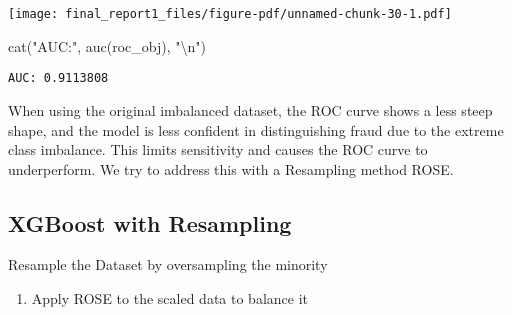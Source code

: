 \documentclass[
  11pt,
  letterpaper,
  DIV=11,
  numbers=noendperiod]{scrartcl}
\newenvironment{Shaded}{}{}
\newcommand{\AttributeTok}[1]{\textcolor[rgb]{0.84,0.23,0.29}{#1}}
\newcommand{\CommentTok}[1]{\textcolor[rgb]{0.42,0.45,0.49}{#1}}
\newcommand{\ConstantTok}[1]{\textcolor[rgb]{0.00,0.36,0.77}{#1}}
\newcommand{\DecValTok}[1]{\textcolor[rgb]{0.00,0.36,0.77}{#1}}
\newcommand{\FloatTok}[1]{\textcolor[rgb]{0.00,0.36,0.77}{#1}}
\newcommand{\FunctionTok}[1]{\textcolor[rgb]{0.44,0.26,0.76}{#1}}
\newcommand{\NormalTok}[1]{\textcolor[rgb]{0.14,0.16,0.18}{#1}}
\newcommand{\OtherTok}[1]{\textcolor[rgb]{0.44,0.26,0.76}{#1}}
\newcommand{\SpecialCharTok}[1]{\textcolor[rgb]{0.00,0.36,0.77}{#1}}
\newcommand{\StringTok}[1]{\textcolor[rgb]{0.01,0.18,0.38}{#1}}
\providecommand{\tightlist}{%
  \setlength{\itemsep}{0pt}\setlength{\parskip}{0pt}}\usepackage{longtable,booktabs,array}
\begin{document}
\texttt{[image: final\_report1\_files/figure-pdf/unnamed-chunk-30-1.pdf]}

\begin{Shaded}
\begin{Highlighting}[]
\FunctionTok{cat}\NormalTok{(}\StringTok{"AUC:"}\NormalTok{, }\FunctionTok{auc}\NormalTok{(roc\_obj), }\StringTok{"}\SpecialCharTok{\textbackslash{}n}\StringTok{"}\NormalTok{)}
\end{Highlighting}
\end{Shaded}

\begin{verbatim}
AUC: 0.9113808 
\end{verbatim}

When using the original imbalanced dataset, the ROC curve shows a less
steep shape, and the model is less confident in distinguishing fraud due
to the extreme class imbalance. This limits sensitivity and causes the
ROC curve to underperform. We try to address this with a Resampling
method ROSE.

\subsection{XGBoost with Resampling}\label{xgboost-with-resampling}

Resample the Dataset by oversampling the minority

\begin{enumerate}
\def\labelenumi{\arabic{enumi}.}
\setcounter{enumi}{1}
\tightlist
\item
  Apply ROSE to the scaled data to balance it
\end{enumerate}

\begin{Shaded}
\end{Shaded}
\end{document}
